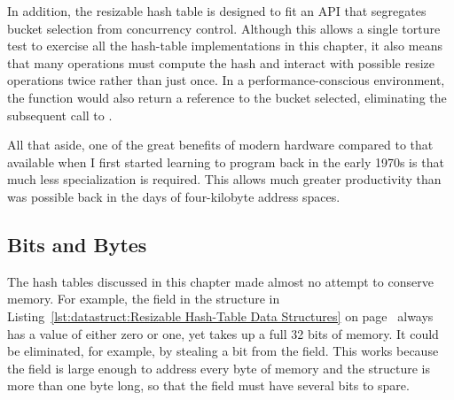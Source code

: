 In addition, the resizable hash table is designed to fit an API
that segregates bucket selection from concurrency control.
Although this allows a single torture test to exercise all the hash-table
implementations in this chapter, it also means that many operations
must compute the hash and interact with possible resize operations twice
rather than just once.
In a performance-conscious environment, the 
function would also return a reference to the bucket selected, eliminating
the subsequent call to .


All that aside, one of the great benefits of modern hardware compared
to that available when I first started learning to program back in
the early 1970s is that much less specialization is required.
This allows much greater productivity than was possible back in the
days of four-kilobyte address spaces.

\subsection{Bits and Bytes}
\label{sec:datastruct:Bits and Bytes}

The hash tables discussed in this chapter made almost no attempt to conserve
memory.
For example, the  field in the  structure in
Listing~\ref{lst:datastruct:Resizable Hash-Table Data Structures} on
page~\pageref{lst:datastruct:Resizable Hash-Table Data Structures}
always has a value of either zero or one, yet takes up a full 32 bits
of memory.
It could be eliminated, for example, by stealing a bit from the
 field.
This works because the  field is large enough to
address every byte of memory and the  structure
is more than one byte long, so that
the  field must have several bits to spare.

